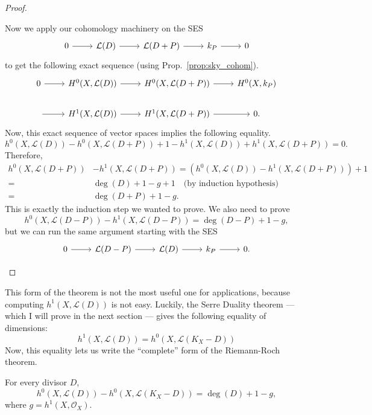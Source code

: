 \begin{proof}
\begin{description}[style=nextline]
          Now we apply our cohomology machinery on the SES
          \[
          \begin{tikzcd}
            0\arrow{r} & \mathcal{L}(D)\arrow{r} & \mathcal{L}(D+P)\arrow{r}
            & k_{P}\arrow{r} & 0
          \end{tikzcd}
          \]
          to get the following exact sequence (using
          Prop.~\ref{prop:sky_cohom}).
          \[
          \begin{tikzcd}
            0\arrow{r} & H^{0}(X, \mathcal{L}(D))\arrow{r}
            & H^{0}(X, \mathcal{L}(D+P))\arrow{r}
            & H^{0}(X, k_{P}) \\
            \arrow{r} & H^{1}(X, \mathcal{L}(D))\arrow{r}
            & H^{1}(X, \mathcal{L}(D+P))\arrow{r} & 0.
          \end{tikzcd}
          \]
          Now, this exact sequence of vector spaces implies the following
          equality.
          \[
          h^{0}(X,\mathcal{L}(D))-h^{0}(X, \mathcal{L}(D+P))
          +1-h^{1}(X,\mathcal{L}(D))+h^{1}(X,\mathcal{L}(D+P)) = 0.
          \]
          Therefore,
          \begin{align*}
            h^{0}(X,\mathcal{L}(D+P))&-h^{1}(X,\mathcal{L}(D+P))
            =\left(h^{0}(X,\mathcal{L}(D))-h^{1}(X,\mathcal{L}(D+P))\right)
              +1 \\
            =&\deg(D)+1-g+1\quad\text{(by induction hypothesis)} \\
            =&\deg(D+P)+1-g.
          \end{align*}
          This is exactly the induction step we wanted to prove.
          We also need to prove
          \[
            h^{0}(X,\mathcal{L}(D-P))-h^{1}(X,\mathcal{L}(D-P))
            =\deg(D-P)+1-g,
          \]
          but we can run the same argument starting with the SES
          \[
          \begin{tikzcd}
            0\arrow{r} & \mathcal{L}(D-P)\arrow{r} & \mathcal{L}(D)\arrow{r}
            & k_{P}\arrow{r} & 0.
          \end{tikzcd}
          \]
  \end{description}
\end{proof}

This form of the theorem is not the most useful one for applications,
because computing $h^{1}(X,\mathcal{L}(D))$ is not easy. Luckily, the Serre
Duality theorem --- which I will prove in the next section --- gives the
following equality of dimensions:
\[h^{1}(X,\mathcal{L}(D))=h^{0}(X,\mathcal{L}(K_{X}-D))\]
Now, this equality lets us write the ``complete'' form of the Riemann-Roch
theorem.
\begin{thm}\label{thm:riemann_roch}
  For every divisor $D$,
  \[
    h^{0}(X, \mathcal{L}(D))-h^{0}(X, \mathcal{L}(K_{X}-D))=\deg(D)+1-g,
  \]
  where $g=h^{1}(X, \mathcal{O}_{X})$.
\end{thm}


